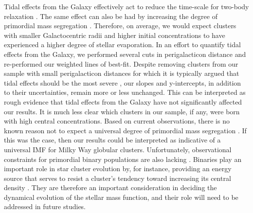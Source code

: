 Tidal effects from the Galaxy effectively act to reduce the time-scale
for two-body relaxation \citep[e.g.][]{heggie03}.  The same effect can also be had by
increasing the degree of primordial mass segregation
\citep[e.g.][]{spitzer87, portegieszwart01}.  Therefore, on average,
we would expect clusters with smaller Galactocentric radii and higher
initial concentrations to have experienced a higher degree of stellar
evaporation.  In an effort to quantify tidal effects from the Galaxy,
we performed several cuts in perigalacticon distance \citep{dinescu99,
  dinescu07} and re-performed our weighted lines of best-fit.  Despite
removing clusters from our sample with small perigalacticon distances
for which it is typically argued that tidal effects should be the most
severe \citep[e.g.][]{heggie03}, our slopes and 
y-intercepts, in addition to their uncertainties, remain more or less
unchanged.  This can be interpreted as rough evidence that tidal effects
from the Galaxy have not 
significantly affected our results.  It is much less clear which
clusters in our sample, if any, were born with high central 
concentrations.  Based on current observations, there is no
known reason not to expect a universal degree of primordial mass
segregation \citep[e.g.][]{portegieszwart10}.  If this was the case,
then our results could be interpreted as indicative of a
universal IMF for Milky Way globular clusters.  Unfortunately,
observational constraints for primordial 
binary populations are also lacking \citep[e.g.][]{mckee07}.  Binaries
play an important 
role in star cluster evolution by, for instance, providing an energy
source that serves to resist a cluster's tendency toward increasing 
its central density \citep{hut83}.  They are therefore an important consideration in
deciding the dynamical evolution of the stellar mass function, and
their role will need to be addressed in future studies.  

